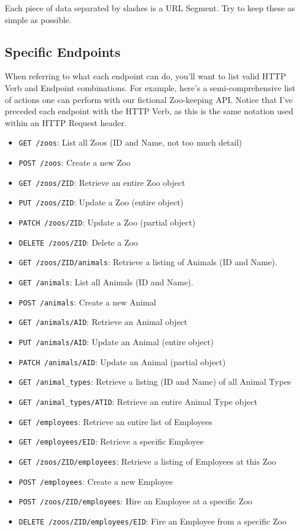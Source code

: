\documentclass{book}
\begin{document}
Each piece of data separated by slashes is a URL Segment. Try to keep these as simple as possible.

\subsection{Specific Endpoints}

When referring to what each endpoint can do, you'll want to list valid HTTP Verb and Endpoint combinations. For example, here's a semi-comprehensive list of actions one can perform with our fictional Zoo-keeping API. Notice that I've preceded each endpoint with the HTTP Verb, as this is the same notation used within an HTTP Request header.

\begin{itemize}
\item \texttt{GET /zoos}: List all Zoos (ID and Name, not too much detail)
\item \texttt{POST /zoos}: Create a new Zoo
\item \texttt{GET /zoos/ZID}: Retrieve an entire Zoo object
\item \texttt{PUT /zoos/ZID}: Update a Zoo (entire object)
\item \texttt{PATCH /zoos/ZID}: Update a Zoo (partial object)
\item \texttt{DELETE /zoos/ZID}: Delete a Zoo
\item \texttt{GET /zoos/ZID/animals}: Retrieve a listing of Animals (ID and Name).
\item \texttt{GET /animals}: List all Animals (ID and Name).
\item \texttt{POST /animals}: Create a new Animal
\item \texttt{GET /animals/AID}: Retrieve an Animal object
\item \texttt{PUT /animals/AID}: Update an Animal (entire object)
\item \texttt{PATCH /animals/AID}: Update an Animal (partial object)
\item \texttt{GET /animal\_types}: Retrieve a listing (ID and Name) of all Animal Types
\item \texttt{GET /animal\_types/ATID}: Retrieve an entire Animal Type object
\item \texttt{GET /employees}: Retrieve an entire list of Employees
\item \texttt{GET /employees/EID}: Retrieve a specific Employee
\item \texttt{GET /zoos/ZID/employees}: Retrieve a listing of Employees at this Zoo
\item \texttt{POST /employees}: Create a new Employee
\item \texttt{POST /zoos/ZID/employees}: Hire an Employee at a specific Zoo
\item \texttt{DELETE /zoos/ZID/employees/EID}: Fire an Employee from a specific Zoo
\end{itemize}
\end{document}
